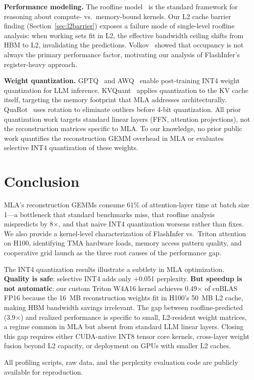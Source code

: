 \documentclass[10pt,twocolumn]{article}
\begin{document}
\textbf{Performance modeling.}  The roofline model~\cite{roofline} is the standard framework for reasoning about compute- vs.\ memory-bound kernels.  Our L2 cache barrier finding (Section~\ref{sec:l2barrier}) exposes a failure mode of single-level roofline analysis: when working sets fit in L2, the effective bandwidth ceiling shifts from HBM to L2, invalidating the predictions.  Volkov~\cite{volkov2010} showed that occupancy is not always the primary performance factor, motivating our analysis of FlashInfer's register-heavy approach.

\textbf{Weight quantization.}  GPTQ~\cite{gptq} and AWQ~\cite{awq} enable post-training INT4 weight quantization for LLM inference.  KVQuant~\cite{kvquant} applies quantization to the KV cache itself, targeting the memory footprint that MLA addresses architecturally.  QuaRot~\cite{quarot} uses rotation to eliminate outliers before 4-bit quantization.  All prior quantization work targets standard linear layers (FFN, attention projections), not the reconstruction matrices specific to MLA.  To our knowledge, no prior public work quantifies the reconstruction GEMM overhead in MLA or evaluates selective INT4 quantization of these weights.

\section{Conclusion}

MLA's reconstruction GEMMs consume 61\% of attention-layer time at batch size 1---a bottleneck that standard benchmarks miss, that roofline analysis mispredicts by 8$\times$, and that naive INT4 quantization worsens rather than fixes.  We also provide a kernel-level characterization of FlashInfer vs.\ Triton attention on H100, identifying TMA hardware loads, memory access pattern quality, and cooperative grid launch as the three root causes of the performance gap.

The INT4 quantization results illustrate a subtlety in MLA optimization.  \textbf{Quality is safe}: selective INT4 adds only +0.051 perplexity.  \textbf{But speedup is not automatic}: our custom Triton W4A16 kernel achieves 0.49$\times$ of cuBLAS FP16 because the 16~MB reconstruction weights fit in H100's 50~MB L2 cache, making HBM bandwidth savings irrelevant.  The gap between roofline-predicted (3.9$\times$) and realized performance is specific to small, L2-resident weight matrices, a regime common in MLA but absent from standard LLM linear layers.  Closing this gap requires either CUDA-native INT8 tensor core kernels, cross-layer weight fusion beyond L2 capacity, or deployment on GPUs with smaller L2 caches.

All profiling scripts, raw data, and the perplexity evaluation code are publicly available for reproduction.




\end{document}
